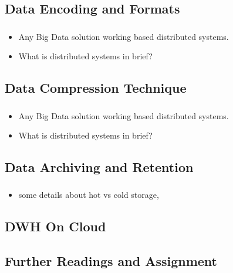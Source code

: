 \subsection{Data Encoding and Formats}

\begin{frame}
    \frametitle{\subsecname}
    \begin{itemize}[<+->]
        \item Any Big Data solution working based distributed systems.
        \item What is distributed systems in brief?
    \end{itemize}
\end{frame}
\subsection{Data Compression Technique}

\begin{frame}
    \frametitle{\subsecname}
    \begin{itemize}[<+->]
        \item Any Big Data solution working based distributed systems.
        \item What is distributed systems in brief?
    \end{itemize}
\end{frame}

\subsection{Data Archiving and Retention}
\begin{frame}
    \frametitle{\subsecname}
    \begin{itemize}[<+->]
        \item some details about hot vs cold storage,
    \end{itemize}
\end{frame}


\subsection{DWH On Cloud}



\subsection{Further Readings and Assignment}


